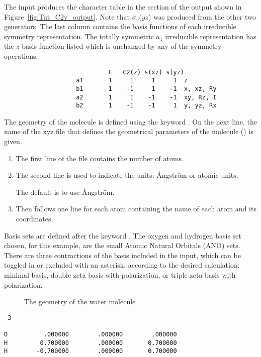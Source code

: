 The input produces the character table in the 
 section of the output shown in 
Figure~\ref{fig:Tut_C2v_output}. Note that $\sigma_v$($yz$) was produced from 
the other two generators.  The last column contains the basis functions of 
each irreducible symmetry representation.  The totally symmetric $a_1$ 
irreducible representation has the $z$ basis function listed which is unchanged 
by any of the symmetry operations.

\label{fig:Tut_C2v_output}
\begin{verbatim}
                             E   C2(z) s(xz) s(yz)
                    a1       1     1     1     1  z
                    b1       1    -1     1    -1  x, xz, Ry
                    a2       1     1    -1    -1  xy, Rz, I
                    b2       1    -1    -1     1  y, yz, Rx
\end{verbatim}



The geometry of the molecule is defined using the keyword . On 
the next line,  the name of the xyz file that defines the geometrical 
parameters of the molecule () is given. 
\begin{enumerate}
\item The first line of the  file contains the number of atoms. 
\item The second line is used to indicate the units: \AA ngstr\"om or atomic units. 

The default is to use \AA ngstr\"om. 
\item Then follows one line for each atom containing the name of each atom and its coordinates. 
\end{enumerate}

Basis sets are defined after the keyword . The oxygen
and hydrogen basis set chosen, for this example, are the small Atomic Natural Orbitals 
(ANO) sets.  There are three contractions of the basis included in the input,
which can be toggled in or excluded with an asterisk, according to the desired calculation:
minimal basis, double zeta basis with polarization, or triple zeta basis with polarization.
\ifmanual
\begin{figure}[ht]
\caption{The geometry of the water molecule}
\label{fig:coord}
\end{figure}
{\footnotesize
\begin{verbatim}
 3

O	       .000000        .000000	     .000000  
H	      0.700000        .000000	    0.700000 
H	     -0.700000        .000000	    0.700000
\end{verbatim} }
\fi


